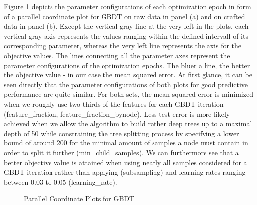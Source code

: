 Figure \ref{fig:GBDT_ParallelPlot} depicts the parameter configurations of each optimization epoch in form of a parallel coordinate plot for GBDT on raw data in panel (a) and on crafted data in panel (b). Except the vertical gray line at the very left in the plots, each vertical gray axis represents the values ranging within the defined intervall of its corresponding parameter, whereas the very left line represents the axis for the objective values. The lines connecting all the parameter axes represent the parameter configurations of the optimization epochs. The bluer a line, the better the objective value - in our case the mean squared error. 
At first glance, it can be seen directly that the parameter configurations of both plots for good predictive performance are quite similar. For both sets, the mean squared error is minimized when we roughly use two-thirds of the features for each GBDT iteration (feature\_fraction, feature\_fraction\_bynode). Less test error is more likely achieved when we allow the algorithm to build rather deep trees up to a maximal depth of 50 while constraining the tree splitting process by specifying a lower bound of around 200 for the minimal amount of samples a node must contain in order to split it further (min\_child\_samples). We can furthermore see that a better objective value is attained when using nearly all samples considered for a GBDT iteration rather than applying (subsampling) and learning rates ranging between 0.03 to 0.05 (learning\_rate).

\begin{figure}[h]
	\centering
	\caption{Parallel Coordinate Plots for GBDT}
	\label{fig:GBDT_ParallelPlot}
\end{figure}

